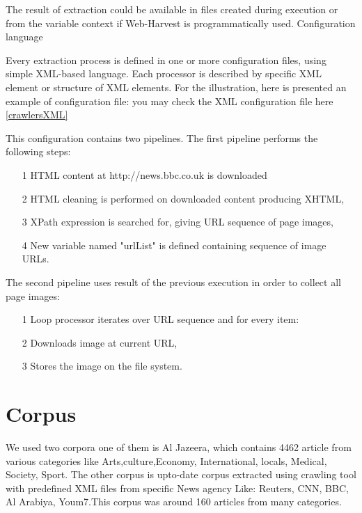 The result of extraction could be available in files created during execution or from the variable context if Web-Harvest is programmatically used.
Configuration language

Every extraction process is defined in one or more configuration files, using simple XML-based language. Each processor is described by specific XML element or structure of XML elements. For the illustration, here is presented an example of configuration file:
you may check the XML configuration file here \ref{crawlersXML}

This configuration contains two pipelines. The first pipeline performs the following steps:
\begin{itemize}
\item [1] HTML content at http://news.bbc.co.uk is downloaded
\item [2] HTML cleaning is performed on downloaded content producing XHTML,
\item [3] XPath expression is searched for, giving URL sequence of page images,
\item [4] New variable named "urlList" is defined containing sequence of image URLs.
\end{itemize}
The second pipeline uses result of the previous execution in order to collect all page images:
\begin{itemize}
\item [1] Loop processor iterates over URL sequence and for every item:
\item [2] Downloads image at current URL,
\item [3] Stores the image on the file system.
\end{itemize}


\section{Corpus}
We used two corpora one of them is Al Jazeera, which contains 4462 article from various categories like Arts,culture,Economy, International, locals, Medical, Society, Sport.
The other corpus is upto-date corpus extracted using crawling tool with predefined XML files from specific News agency Like: Reuters, CNN, BBC, Al Arabiya, Youm7.This corpus was around 160 articles from many categories.



